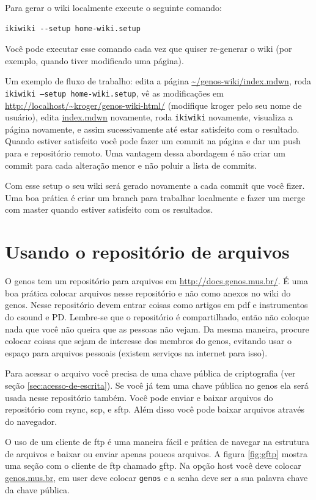 \documentclass[12pt,brazil]{book}
\newcommand{\code}[1]{\texttt{#1}}
\begin{document}
Para gerar o wiki localmente execute o seguinte comando:

\begin{verbatim}
ikiwiki --setup home-wiki.setup
\end{verbatim}

Você pode executar esse comando cada vez que quiser re-generar o wiki
(por exemplo, quando tiver modificado uma página).

Um exemplo de fluxo de trabalho: edita a página
\url{~/genos-wiki/index.mdwn}, roda \code{ikiwiki --setup
  home-wiki.setup}, vê as modificações em
\url{http://localhost/~kroger/genos-wiki-html/} (modifique kroger pelo
seu nome de usuário), edita \url{index.mdwn} novamente, roda
\code{ikiwiki} novamente, visualiza a página novamente, e assim
sucessivamente até estar satisfeito com o resultado. Quando estiver
satisfeito você pode fazer um commit na página e dar um push para e
repositório remoto. Uma vantagem dessa abordagem é não criar um commit
para cada alteração menor e não poluir a lista de commits.

Com esse setup o seu wiki será gerado novamente a cada commit que você
fizer. Uma boa prática é criar um branch para trabalhar localmente e
fazer um merge com master quando estiver satisfeito com os resultados.

\section{Usando o repositório de arquivos}
\label{sec:usando-o-repositorio}

O genos tem um repositório para arquivos em
\url{http://docs.genos.mus.br/}. É uma boa prática colocar arquivos
nesse repositório e não como anexos no wiki do genos. Nesse
repositório devem entrar coisas como artigos em pdf e instrumentos do
csound e PD. Lembre-se que o repositório é compartilhado, então não
coloque nada que você não queira que as pessoas não vejam. Da mesma
maneira, procure colocar coisas que sejam de interesse dos membros do
genos, evitando usar o espaço para arquivos pessoais (existem serviços
na internet para isso).

Para acessar o arquivo você precisa de uma chave pública de
criptografia (ver seção \ref{sec:acesso-de-escrita}). Se você já tem
uma chave pública no genos ela será usada nesse repositório também.
Você pode enviar e baixar arquivos do repositório com rsync, scp, e
sftp. Além disso você pode baixar arquivos através do navegador.

O uso de um cliente de ftp é uma maneira fácil e prática de navegar na
estrutura de arquivos e baixar ou enviar apenas poucos arquivos. A
figura \ref{fig:gftp} mostra uma seção com o cliente de ftp chamado
gftp. Na opção host você deve colocar \url{genos.mus.br}, em user deve
colocar \code{genos} e a senha deve ser a sua palavra chave da chave
pública.
\end{document}
